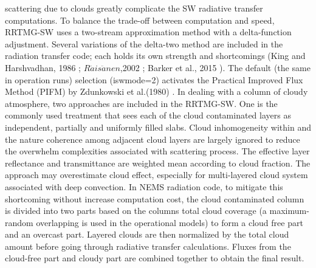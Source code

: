  scattering due to clouds greatly complicate the SW radiative transfer computations. To balance the trade-\/off between computation and speed, R\+R\+T\+M\+G-\/\+SW uses a two-\/stream approximation method with a delta-\/function adjustment. Several variations of the delta-\/two method are included in the radiation transfer code; each holds its own strength and shortcomings (King and Harshvadhan, 1986 \cite{king_and_harshvardhan_1986} ; $R\ddot{a}is\ddot{a}nen$,2002 \cite{raisanen_2002} ; Barker et al., 2015 \cite{barker_et_al_2015}). The default (the same in operation runs) selection (iswmode=2) activates the Practical Improved Flux Method (P\+I\+FM) by Zdunkowski et al.(1980) \cite{zdunkowski_et_al_1980} . In dealing with a column of cloudy atmosphere, two approaches are included in the R\+R\+T\+M\+G-\/\+SW. One is the commonly used treatment that sees each of the cloud contaminated layers as independent, partially and uniformly filled slabs. Cloud inhomogeneity within and the nature coherence among adjacent cloud layers are largely ignored to reduce the overwhelm complexities associated with scattering process. The effective layer reflectance and transmittance are weighted mean according to cloud fraction. The approach may overestimate cloud effect, especially for multi-\/layered cloud system associated with deep convection. In N\+E\+MS radiation code, to mitigate this shortcoming without increase computation cost, the cloud contaminated column is divided into two parts based on the column\textquotesingle{}s total cloud coverage (a maximum-\/random overlapping is used in the operational models) to form a cloud free part and an overcast part. Layered clouds are then normalized by the total cloud amount before going through radiative transfer calculations. Fluxes from the cloud-\/free part and cloudy part are combined together to obtain the final result. ~\newline

